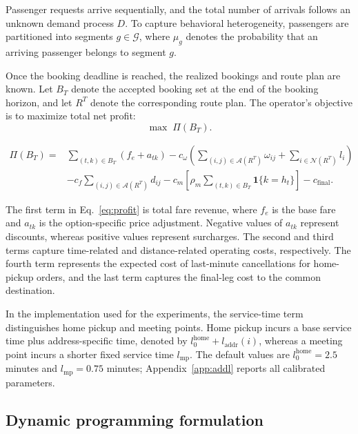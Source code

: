 \documentclass[preprint,12pt,authoryear]{elsarticle}
\begin{document}
Passenger requests arrive sequentially, and the total number of arrivals follows an unknown demand process $D$. To capture behavioral heterogeneity, passengers are partitioned into segments $g\in\mathcal{G}$, where $\mu_g$ denotes the probability that an arriving passenger belongs to segment $g$.

Once the booking deadline is reached, the realized bookings and route plan are known. Let $B_T$ denote the accepted booking set at the end of the booking horizon, and let $R^T$ denote the corresponding route plan. The operator's objective is to maximize total net profit:
\begin{equation}
\max \; \Pi(B_T).
\tag{1}\label{eq:objective}
\end{equation}

\begin{align}
\Pi(B_T)={}&\sum_{(t,k)\in B_T}(f_e+a_{tk})
- c_{\omega}\left(\sum_{(i,j)\in \mathcal{A}(R^T)}\omega_{ij}
+\sum_{i\in \mathcal{N}(R^T)} l_i\right) \nonumber\\
&- c_f \sum_{(i,j)\in \mathcal{A}(R^T)} d_{ij}
- c_m\left[\rho_m \sum_{(t,k)\in B_T}\mathbf{1}\{k=h_t\}\right]
- c_{\text{final}}.
\tag{2}\label{eq:profit}
\end{align}

The first term in Eq.~\eqref{eq:profit} is total fare revenue, where $f_e$ is the base fare and $a_{tk}$ is the option-specific price adjustment. Negative values of $a_{tk}$ represent discounts, whereas positive values represent surcharges. The second and third terms capture time-related and distance-related operating costs, respectively. The fourth term represents the expected cost of last-minute cancellations for home-pickup orders, and the last term captures the final-leg cost to the common destination.

In the implementation used for the experiments, the service-time term distinguishes home pickup and meeting points. Home pickup incurs a base service time plus address-specific time, denoted by $l_0^{\mathrm{home}} + l_{\mathrm{addr}}(i)$, whereas a meeting point incurs a shorter fixed service time $l_{\mathrm{mp}}$. The default values are $l_0^{\mathrm{home}} = 2.5$ minutes and $l_{\mathrm{mp}} = 0.75$ minutes; Appendix~\ref{app:addl} reports all calibrated parameters.

\subsection{Dynamic programming formulation}
\end{document}

